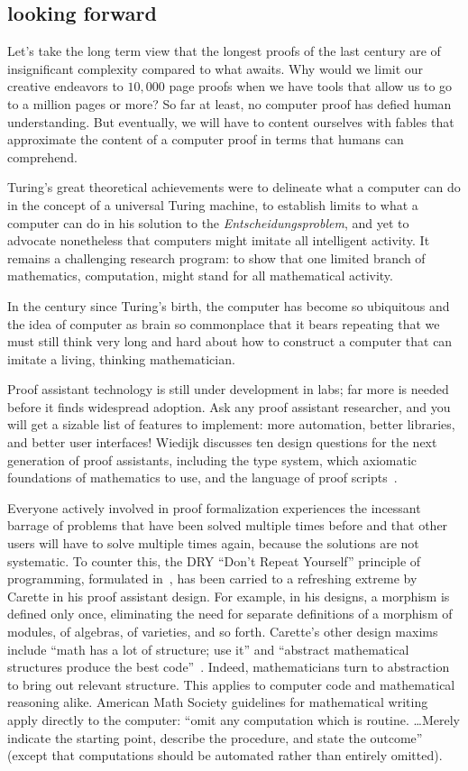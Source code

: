 \documentclass{llncs}
\begin{document}
\subsection{looking forward}

Let's take the long term view that the longest proofs of the last
century are of insignificant complexity compared to what awaits.  Why
would we limit our creative endeavors to $10,000$ page proofs when we
have tools that allow us to go to a million pages or more?  So far at
least, no computer proof has defied human understanding.  But
eventually, we will have to content ourselves with fables that
approximate the content of a computer proof in terms that humans can
comprehend.


Turing's great theoretical achievements were to delineate what a
computer can do in the concept of a universal Turing machine, to
establish limits to what a computer can do in his solution to the {\it
  Entscheidungsproblem}, and yet to advocate nonetheless that
computers might imitate all intelligent activity. It remains a
challenging research program: to show that one limited branch of
mathematics, computation, might stand for all mathematical activity.

In the century since Turing's birth, the computer has become so
ubiquitous and the idea of computer as brain so commonplace that it
bears repeating that we must still think very long and hard about how
to construct a computer that can imitate a living, thinking
mathematician.

Proof assistant technology is still under development in labs; far
more is needed before it finds widespread adoption.  Ask any proof
assistant researcher, and you will get a sizable list of features to
implement: more automation, better libraries, and better user
interfaces!  Wiedijk discusses ten design questions for the next
generation of proof assistants, including the type system, which
axiomatic foundations of mathematics to use, and the language of proof
scripts~\cite{Wie10}.

Everyone actively involved in proof formalization experiences the
incessant barrage of problems that have been solved multiple times
before and that other users will have to solve multiple times again,
because the solutions are not systematic.  To counter this, the DRY
``Don't Repeat Yourself'' principle of programming, formulated
in~\cite{PP00}, has been carried to a refreshing extreme by Carette in
his proof assistant design.  For example, in his designs, a morphism
is defined only once, eliminating the need for separate definitions of
a morphism of modules, of algebras, of varieties, and so forth.
Carette's other design maxims include ``math has a lot of structure;
use it'' and ``abstract mathematical structures produce the best
code''~\cite{Car28p}.  Indeed, mathematicians turn to abstraction to
bring out relevant structure. This applies to computer code and
mathematical reasoning alike.  American Math Society guidelines for
mathematical writing apply directly to the computer: ``omit any
computation which is routine. \dots Merely indicate the starting
point, describe the procedure, and state the outcome''~\cite{DCFPS}
(except that computations should be automated rather than entirely
omitted).
\end{document}
